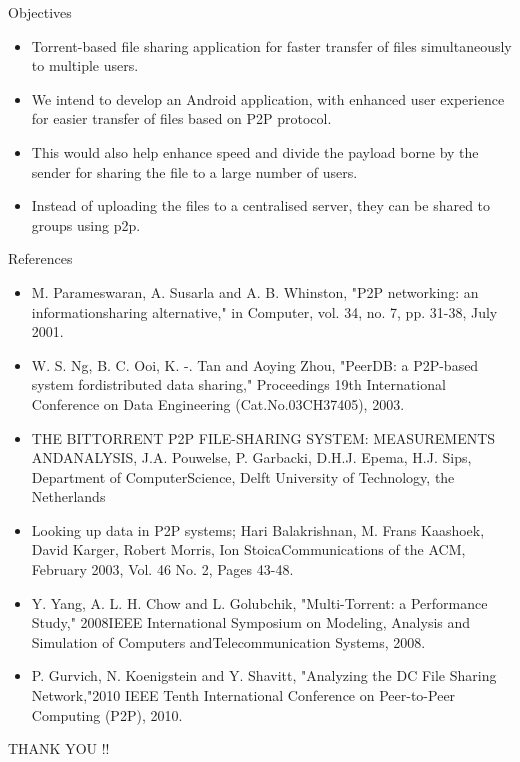 \documentclass[9pt]{beamer}
\begin{document}
\begin{frame}{Objectives}
   \begin{itemize}
       \item Torrent-based file sharing application for faster transfer of files simultaneously to multiple users.
       \item We intend to develop an Android application, with enhanced user experience for easier transfer of files based on P2P protocol.
       \item This would also help enhance speed and divide the payload borne by the sender for sharing the file to a large number of users.
       \item Instead of uploading the files to a centralised server, they can be shared to groups using p2p.
   \end{itemize}
    
\end{frame}

\begin{frame}{References}
    \begin{itemize}
        \item M. Parameswaran, A. Susarla and A. B. Whinston, "P2P networking: an informationsharing alternative," in Computer, vol. 34, no. 7, pp. 31-38, July 2001.
        \item W. S. Ng, B. C. Ooi, K. -. Tan and Aoying Zhou, "PeerDB: a P2P-based system fordistributed data sharing," Proceedings 19th International Conference on Data Engineering (Cat.No.03CH37405), 2003.
        \item THE BITTORRENT P2P FILE-SHARING SYSTEM: MEASUREMENTS ANDANALYSIS, J.A. Pouwelse, P. Garbacki, D.H.J. Epema, H.J. Sips, Department of ComputerScience, Delft University of Technology, the Netherlands
        \item Looking up data in P2P systems; Hari Balakrishnan, M. Frans Kaashoek, David Karger, Robert Morris, Ion StoicaCommunications of the ACM, February 2003, Vol. 46 No. 2, Pages 43-48.
        \item Y. Yang, A. L. H. Chow and L. Golubchik, "Multi-Torrent: a Performance Study," 2008IEEE International Symposium on Modeling, Analysis and Simulation of Computers andTelecommunication Systems, 2008. 
        \item P. Gurvich, N. Koenigstein and Y. Shavitt, "Analyzing the DC File Sharing Network,"2010 IEEE Tenth International Conference on Peer-to-Peer Computing (P2P), 2010.
    \end{itemize}
\end{frame}

\begin{frame}
 \large{ THANK YOU !!}
\end{frame}
\end{document}
